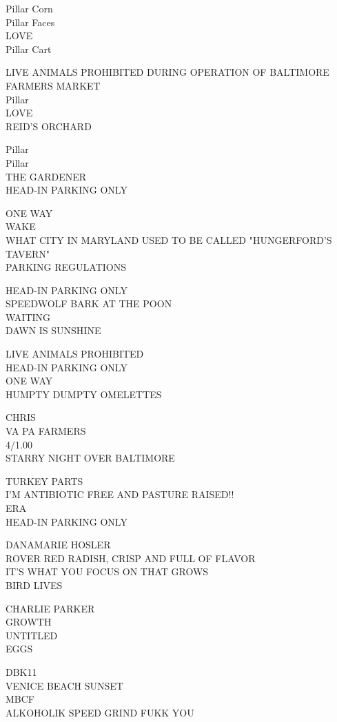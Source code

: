 \documentclass[10pt,letterpaper]{article}
\begin{document}
Pillar Corn\\
Pillar Faces\\
LOVE\\
Pillar Cart

LIVE ANIMALS PROHIBITED DURING OPERATION OF BALTIMORE FARMERS MARKET\\
Pillar\\
LOVE\\
REID'S ORCHARD

Pillar\\
Pillar\\
THE GARDENER\\
HEAD{-}IN PARKING ONLY

ONE WAY\\
WAKE\\
WHAT CITY IN MARYLAND USED TO BE CALLED "HUNGERFORD'S TAVERN"\\
PARKING REGULATIONS

HEAD{-}IN PARKING ONLY\\
SPEEDWOLF BARK AT THE POON\\
WAITING\\
DAWN IS SUNSHINE

LIVE ANIMALS PROHIBITED\\
HEAD{-}IN PARKING ONLY\\
ONE WAY\\
HUMPTY DUMPTY OMELETTES

CHRIS\\
VA PA FARMERS\\
4/1.00\\
STARRY NIGHT OVER BALTIMORE

TURKEY PARTS\\
I'M ANTIBIOTIC FREE AND PASTURE RAISED!!\\
ERA\\
HEAD{-}IN PARKING ONLY

DANAMARIE HOSLER\\
ROVER RED RADISH, CRISP AND FULL OF FLAVOR\\
IT'S WHAT YOU FOCUS ON THAT GROWS\\
BIRD LIVES

CHARLIE PARKER\\
GROWTH\\
UNTITLED\\
EGGS

DBK11\\
VENICE BEACH SUNSET\\
MBCF\\
ALKOHOLIK SPEED GRIND FUKK YOU
\end{document}
